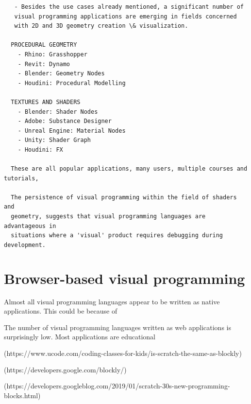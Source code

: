 \begin{lstlisting} 
   - Besides the use cases already mentioned, a significant number of 
   visual programming applications are emerging in fields concerned 
   with 2D and 3D geometry creation \& visualization. 

  PROCEDURAL GEOMETRY 
    - Rhino: Grasshopper
    - Revit: Dynamo  
    - Blender: Geometry Nodes
    - Houdini: Procedural Modelling
  
  TEXTURES AND SHADERS
    - Blender: Shader Nodes
    - Adobe: Substance Designer
    - Unreal Engine: Material Nodes
    - Unity: Shader Graph
    - Houdini: FX

  These are all popular applications, many users, multiple courses and tutorials, 

  The persistence of visual programming within the field of shaders and
  geometry, suggests that visual programming languages are advantageous in
  situations where a 'visual' product requires debugging during development. 
\end{lstlisting}



\section{Browser-based visual programming}
\label{sec:related-webvpl}

Almost all visual programming languages appear to be written as native applications. 
This could be because of 


The number of visual programming languages written as web applications is surprisingly low. 
Most applications are educational


(https://www.ucode.com/coding-classes-for-kids/is-scratch-the-same-as-blockly)

(https://developers.google.com/blockly/)

(https://developers.googleblog.com/2019/01/scratch-30s-new-programming-blocks.html)


